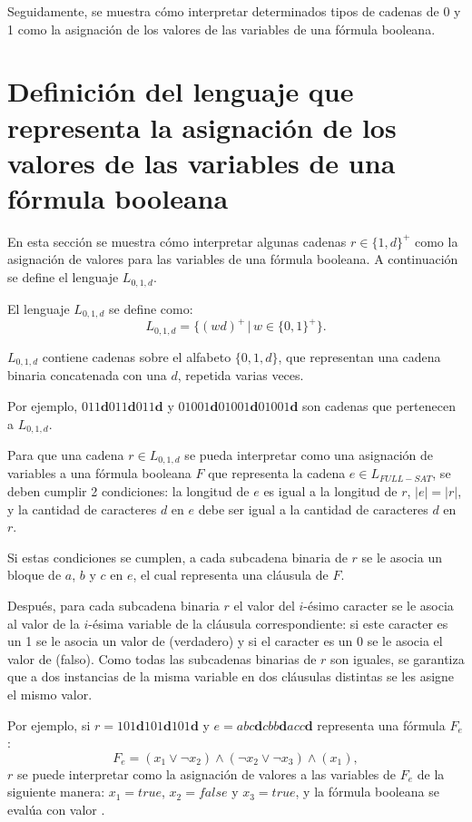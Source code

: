 Seguidamente, se muestra cómo interpretar determinados tipos de cadenas de 0 y 1 como la asignación de los valores de las variables de una fórmula booleana.

\section{Definición del lenguaje que representa la asignación de los valores de las variables de una fórmula booleana}
\label{sec:intsat}

En esta sección se muestra cómo interpretar algunas cadenas $r\in \{1,d\}^+$ como la asignación de valores para las variables de una fórmula booleana.
A continuación se define el lenguaje $L_{0,1,d}$.


\begin{definition}
    El lenguaje $L_{0,1,d}$ se define como:
    $$L_{0,1,d}=\{(wd)^+\,|\,w\in\{0,1\}^+\}.$$
    
    $L_{0,1,d}$ contiene cadenas sobre el alfabeto $\{0,1,d\}$, que representan una cadena binaria concatenada con una $d$,
    repetida varias veces.
\end{definition}

Por ejemplo, $011\mathbf{d}011\mathbf{d}011\mathbf{d}$ y $01001\mathbf{d}01001\mathbf{d}01001\mathbf{d}$ son cadenas que pertenecen a
$L_{0,1,d}$.

Para que una cadena $r\in L_{0,1,d}$ se pueda interpretar como una asignación de variables a una fórmula booleana $F$ que representa la cadena $e\in L_{FULL-SAT}$, se deben cumplir 2 condiciones: la longitud de $e$ es igual a la longitud de $r$, $|e|=|r|$, y la cantidad de caracteres $d$ en $e$ debe ser igual a la cantidad de caracteres $d$ en $r$. 

Si estas condiciones se cumplen, a cada subcadena binaria de $r$ se le asocia un bloque de $a$, $b$ y $c$ en $e$, el cual representa una cláusula de $F$.

Después, para cada subcadena binaria $r$ el valor del $i$-ésimo caracter se le asocia al valor de la $i$-ésima variable de la cláusula correspondiente: si este caracter es un 1 se le asocia un valor de \true{} (verdadero) y si el caracter es un 0 se le asocia el valor de \false{} (falso). Como todas las subcadenas binarias de $r$ son iguales, se garantiza que a dos instancias de la misma variable en dos cláusulas distintas se les asigne el mismo valor.

Por ejemplo, si $r=101\mathbf{d}101\mathbf{d}101\mathbf{d}$ y $e=abc\mathbf{d}cbb\mathbf{d}acc\mathbf{d}$ representa una fórmula $F_e$:
$$F_e=(x_1\vee\neg x_2)\wedge (\neg x_2 \vee \neg x_3)\wedge (x_1),$$
$r$ se puede interpretar como la asignación de valores a las variables de $F_e$ de la 
siguiente manera: $x_1=true$, $x_2=false$ y $x_3=true$, y la fórmula booleana se evalúa con valor \true{}.

